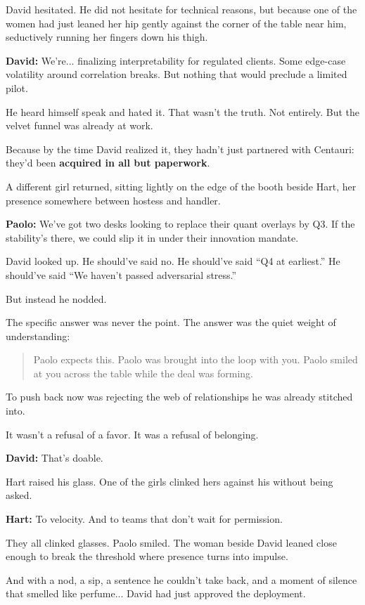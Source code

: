 David hesitated. He did not hesitate for technical reasons, but because one of the women had just leaned her hip gently against 
the corner of the table near him, seductively running her fingers down his thigh.

\textbf{David:}  
We’re... finalizing interpretability for regulated clients.  
Some edge-case volatility around correlation breaks.  
But nothing that would preclude a limited pilot.

He heard himself speak and hated it.  
That wasn’t the truth. Not entirely.  
But the velvet funnel was already at work.

Because by the time David realized it, they hadn’t just partnered with Centauri:  
they’d been \textbf{acquired in all but paperwork}.

A different girl returned, sitting lightly on the edge of the booth beside Hart, her presence somewhere between 
hostess and handler.

\textbf{Paolo:}  
We’ve got two desks looking to replace their quant overlays by Q3.  
If the stability’s there, we could slip it in under their innovation mandate.

David looked up.  
He should’ve said no.  
He should’ve said “Q4 at earliest.”  
He should’ve said “We haven’t passed adversarial stress.”

But instead he nodded.

The specific answer was never the point. The answer was the quiet weight of understanding:  

\begin{quote}
  Paolo expects this. Paolo was brought into the loop with you. 
  Paolo smiled at you across the table while the deal 
  was forming.
\end{quote}

To push back now was rejecting the web of relationships he was already stitched into.  

It wasn’t a refusal of a favor.  It was a refusal of belonging.

\textbf{David:}  
That’s doable.

Hart raised his glass. One of the girls clinked hers against his without being asked.

\textbf{Hart:}  
To velocity.  
And to teams that don’t wait for permission.

They all clinked glasses.  
Paolo smiled.  
The woman beside David leaned close enough to break the threshold where presence turns into 
impulse. 

And with a nod, a sip, a sentence he couldn’t take back,  
and a moment of silence that smelled like perfume...
David had just approved the deployment.

